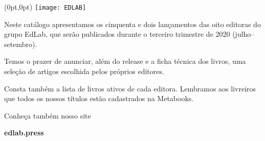 \begin{textblock*}{5.625in}(0pt,0pt)%
\vspace*{-2.4cm}
\hspace*{-2.1cm}\texttt{[image: EDLAB]}
\end{textblock*}

\pagebreak

\pagestyle{indice}

{}

\vspace{1.2cm}

{}


\hspace*{-7cm}\hrulefill\hspace*{-7cm}

\vspace{1cm}

\hspace*{-.5cm}\parbox{180pt}{\raggedright 
Neste catálogo apresentamos os cinquenta e dois
lançamentos das oito editoras do grupo EdLab, que serão publicados durante o
terceiro trimestre de 2020 (julho--setembro). 

Temos o prazer de anunciar, além do release e a ficha técnica dos livros, uma 
seleção de artigos escolhida pelos próprios editores. 

Consta também a lista de 
livros ativos de cada editora. Lembramos aos livreiros que todos os nossos títulos
estão cadastrados na Metabooks.

Conheça também nosso site

{\Formular\textbf{edlab.press}}
} %

